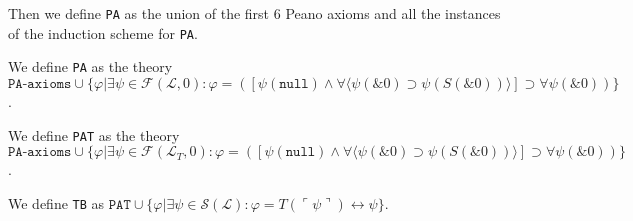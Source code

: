 Then we define \texttt{PA} as the union of the first 6 Peano axioms and all the instances of the induction scheme for \texttt{PA}.
\begin{definition}\label{def:PA}
  \leanok
  We define \texttt{PA} as the theory $\texttt{PA-axioms} \cup \{φ | ∃ψ \in \mathcal{F}(\mathcal{L},{0}) : φ = ([ψ(\texttt{null}) \wedge ∀\langle ψ(\&0) \supset ψ(S(\&0)) \rangle ] \supset ∀ψ(\&0))\}$.
\end{definition}

\begin{definition}\label{def:PAT}
  \leanok
    We define \texttt{PAT} as the theory $\texttt{PA-axioms} \cup \{φ | ∃ψ \in \mathcal{F}(\mathcal{L}_T,{0}) : φ = ([ψ(\texttt{null}) \wedge ∀\langle ψ(\&0) \supset ψ(S(\&0)) \rangle ] \supset ∀ψ(\&0))\}$.
\end{definition}

\begin{definition}[\texttt{TB}]\label{def:TB}
  \leanok
    We define \texttt{TB} as $\texttt{PAT} \cup \{φ | ∃ψ \in \mathcal{S}(\mathcal{L}) : φ = T(⌜ψ⌝) \leftrightarrow ψ\}$.
\end{definition}
